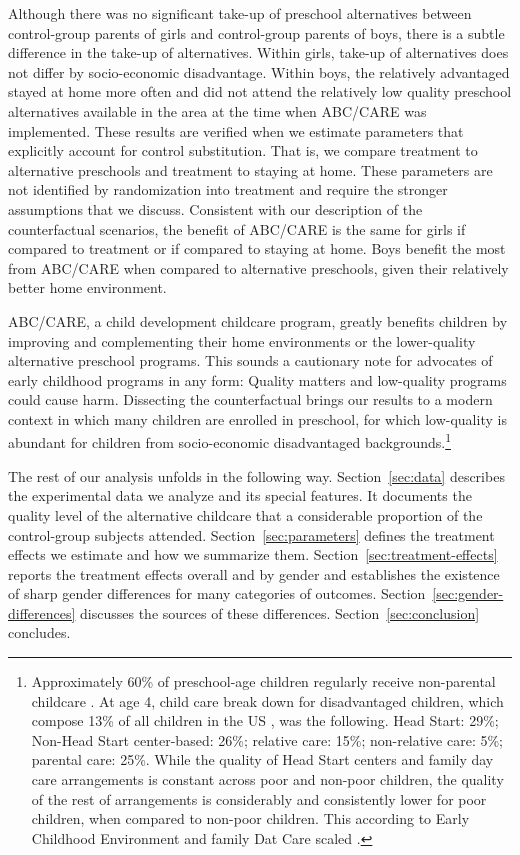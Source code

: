 Although there was no significant take-up of preschool alternatives between control-group parents of girls and control-group parents of boys, there is a subtle difference in the take-up of alternatives. Within girls, take-up of alternatives does not differ by socio-economic disadvantage. Within boys, the relatively advantaged stayed at home more often and did not attend the relatively low quality preschool alternatives available in the area at the time when ABC/CARE was implemented. These results are verified when we estimate parameters that explicitly account for control substitution. That is, we compare treatment to alternative preschools and treatment to staying at home. These parameters are not identified by randomization into treatment and require the stronger assumptions that we discuss. Consistent with our description of the counterfactual scenarios, the benefit of ABC/CARE is the same for girls if compared to treatment or if compared to staying at home. Boys benefit the most from ABC/CARE when compared to alternative preschools, given their relatively better home environment.

ABC/CARE, a child development childcare program, greatly benefits children by improving and complementing their home environments or the lower-quality alternative preschool programs. This sounds a cautionary note for advocates of early childhood programs in any form: Quality matters and low-quality programs could cause harm. Dissecting the counterfactual brings our results to a modern context in which many children are enrolled in preschool, for which low-quality is abundant for children from socio-economic disadvantaged backgrounds.\footnote{Approximately 60\% of preschool-age children regularly receive non-parental childcare \citep{FIFCFS_2009_Wellbeing_REPORT}. At age 4, child care break down for disadvantaged children, which compose 13\% of all children in the US \citep{USCB_2014_CoverageReport}, was the following. Head Start: 29\%; Non-Head Start center-based: 26\%; relative care: 15\%; non-relative care: 5\%; parental care: 25\%. While the quality of Head Start centers and family day care arrangements is constant across poor and non-poor children, the quality of the rest of arrangements is considerably and consistently lower for poor children, when compared to non-poor children. This according to Early Childhood Environment and family Dat Care scaled \citep{FIFCFS_2009_Wellbeing_REPORT}.}

The rest of our analysis unfolds in the following way. Section~\ref{sec:data} describes the experimental data we analyze and its special features. It documents the quality level of the alternative childcare that a considerable proportion of the control-group subjects attended. Section~\ref{sec:parameters} defines the treatment effects we estimate and how we summarize them. Section~\ref{sec:treatment-effects} reports the treatment effects overall and by gender and establishes the existence of sharp gender differences for many categories of outcomes. Section~\ref{sec:gender-differences} discusses the sources of these differences. Section~\ref{sec:conclusion} concludes.
